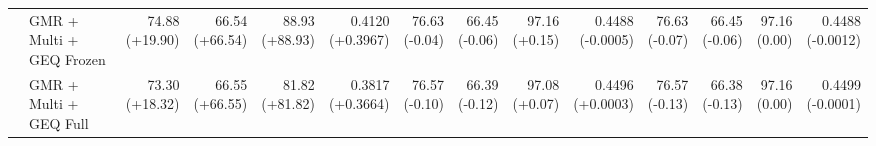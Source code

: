 \documentclass{article}
\begin{document}
{\begin{tabular}{llrrrrrrrrrrrr}
 & GMR + Multi + GEQ Frozen & \shortstack{74.88 \\ {\scriptsize\textcolor{Gain}{(+19.90)}}} & \shortstack{66.54 \\ {\scriptsize\textcolor{Gain}{(+66.54)}}} & \shortstack{88.93 \\ {\scriptsize\textcolor{Gain}{(+88.93)}}} & \shortstack{0.4120 \\ {\scriptsize\textcolor{Gain}{(+0.3967)}}} & \shortstack{76.63 \\ {\scriptsize\textcolor{Loss}{(-0.04)}}} & \shortstack{66.45 \\ {\scriptsize\textcolor{Loss}{(-0.06)}}} & \shortstack{97.16 \\ {\scriptsize\textcolor{Gain}{(+0.15)}}} & \shortstack{0.4488 \\ {\scriptsize\textcolor{Loss}{(-0.0005)}}} & \shortstack{76.63 \\ {\scriptsize\textcolor{Loss}{(-0.07)}}} & \shortstack{66.45 \\ {\scriptsize\textcolor{Loss}{(-0.06)}}} & \shortstack{97.16 \\ {\scriptsize\textcolor{Zero}{(0.00)}}} & \shortstack{0.4488 \\ {\scriptsize\textcolor{Loss}{(-0.0012)}}} \\
 & GMR + Multi + GEQ Full & \shortstack{73.30 \\ {\scriptsize\textcolor{Gain}{(+18.32)}}} & \shortstack{66.55 \\ {\scriptsize\textcolor{Gain}{(+66.55)}}} & \shortstack{81.82 \\ {\scriptsize\textcolor{Gain}{(+81.82)}}} & \shortstack{0.3817 \\ {\scriptsize\textcolor{Gain}{(+0.3664)}}} & \shortstack{76.57 \\ {\scriptsize\textcolor{Loss}{(-0.10)}}} & \shortstack{66.39 \\ {\scriptsize\textcolor{Loss}{(-0.12)}}} & \shortstack{97.08 \\ {\scriptsize\textcolor{Gain}{(+0.07)}}} & \shortstack{0.4496 \\ {\scriptsize\textcolor{Gain}{(+0.0003)}}} & \shortstack{76.57 \\ {\scriptsize\textcolor{Loss}{(-0.13)}}} & \shortstack{66.38 \\ {\scriptsize\textcolor{Loss}{(-0.13)}}} & \shortstack{97.16 \\ {\scriptsize\textcolor{Zero}{(0.00)}}} & \shortstack{0.4499 \\ {\scriptsize\textcolor{Loss}{(-0.0001)}}} \\

\end{tabular}}
\end{document}
